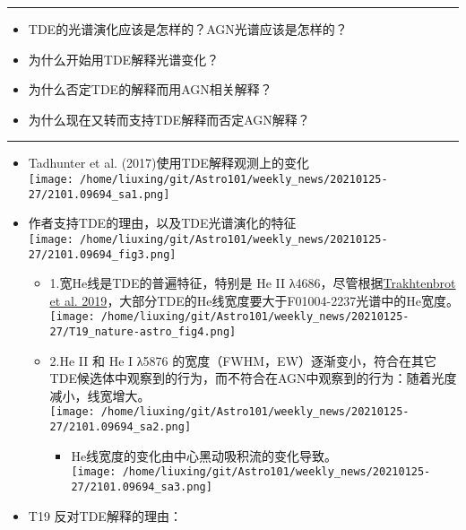 \documentclass[
]{article}
\begin{document}
\begin{center}\rule{0.5\linewidth}{0.5pt}\end{center}

\begin{itemize}
\item
  TDE的光谱演化应该是怎样的？AGN光谱应该是怎样的？
\item
  为什么开始用TDE解释光谱变化？
\item
  为什么否定TDE的解释而用AGN相关解释？
\item
  为什么现在又转而支持TDE解释而否定AGN解释？
\end{itemize}

\begin{center}\rule{0.5\linewidth}{0.5pt}\end{center}

\begin{itemize}
\item
  Tadhunter et al. (2017)使用TDE解释观测上的变化\\
  \texttt{[image: /home/liuxing/git/Astro101/weekly\_news/20210125-27/2101.09694\_sa1.png]}
\item
  作者支持TDE的理由，以及TDE光谱演化的特征\\
  \texttt{[image: /home/liuxing/git/Astro101/weekly\_news/20210125-27/2101.09694\_fig3.png]}

  \begin{itemize}
  \item
    1.宽He线是TDE的普遍特征，特别是 He II
    λ4686，尽管根据\href{https://www.nature.com/articles/s41550-018-0661-3.pdf}{Trakhtenbrot
    et al. 2019}，大部分TDE的He线宽度要大于F01004-2237光谱中的He宽度。\\
    \texttt{[image: /home/liuxing/git/Astro101/weekly\_news/20210125-27/T19\_nature-astro\_fig4.png]}
  \item
    2.He II 和 He I λ5876
    的宽度（FWHM，EW）逐渐变小，符合在其它TDE候选体中观察到的行为，而不符合在AGN中观察到的行为：随着光度减小，线宽增大。\\
    \texttt{[image: /home/liuxing/git/Astro101/weekly\_news/20210125-27/2101.09694\_sa2.png]}

    \begin{itemize}
    \item
      He线宽度的变化由中心黑动吸积流的变化导致。\\
      \texttt{[image: /home/liuxing/git/Astro101/weekly\_news/20210125-27/2101.09694\_sa3.png]}
    \end{itemize}
  \end{itemize}
\item
  T19 反对TDE解释的理由：


\end{itemize}
\end{document}
